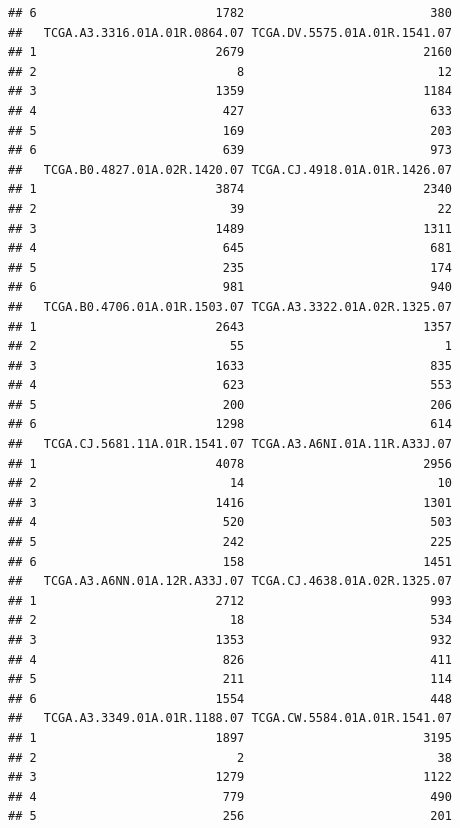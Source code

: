 \documentclass[
]{article}
\begin{document}
\begin{verbatim}
## 6                         1782                          380
##   TCGA.A3.3316.01A.01R.0864.07 TCGA.DV.5575.01A.01R.1541.07
## 1                         2679                         2160
## 2                            8                           12
## 3                         1359                         1184
## 4                          427                          633
## 5                          169                          203
## 6                          639                          973
##   TCGA.B0.4827.01A.02R.1420.07 TCGA.CJ.4918.01A.01R.1426.07
## 1                         3874                         2340
## 2                           39                           22
## 3                         1489                         1311
## 4                          645                          681
## 5                          235                          174
## 6                          981                          940
##   TCGA.B0.4706.01A.01R.1503.07 TCGA.A3.3322.01A.02R.1325.07
## 1                         2643                         1357
## 2                           55                            1
## 3                         1633                          835
## 4                          623                          553
## 5                          200                          206
## 6                         1298                          614
##   TCGA.CJ.5681.11A.01R.1541.07 TCGA.A3.A6NI.01A.11R.A33J.07
## 1                         4078                         2956
## 2                           14                           10
## 3                         1416                         1301
## 4                          520                          503
## 5                          242                          225
## 6                          158                         1451
##   TCGA.A3.A6NN.01A.12R.A33J.07 TCGA.CJ.4638.01A.02R.1325.07
## 1                         2712                          993
## 2                           18                          534
## 3                         1353                          932
## 4                          826                          411
## 5                          211                          114
## 6                         1554                          448
##   TCGA.A3.3349.01A.01R.1188.07 TCGA.CW.5584.01A.01R.1541.07
## 1                         1897                         3195
## 2                            2                           38
## 3                         1279                         1122
## 4                          779                          490
## 5                          256                          201

\end{verbatim}
\end{document}
